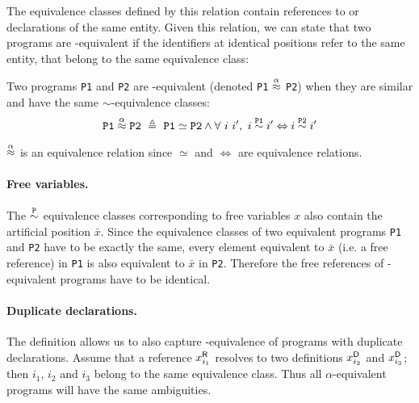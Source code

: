 \noindent
The equivalence classes defined by this relation contain references to or declarations of 
the same entity. 
Given this relation, we can state that two programs are \a-equivalent if the identifiers at identical positions refer to the same entity, that belong to the same equivalence class:

\begin{definition}[\a-equivalence] Two programs {\tt P1} and {\tt P2} are \a-equivalent (denoted {\tt P1} $\stackrel{\alpha}{\approx}$ {\tt P2}) when they are similar and have the same $\sim$-equivalence classes:
\vspace*{-.5\baselineskip}
 $$\mtt{P1} \aeq \mtt{P2}\ \triangleq\ \mtt{P1} \simeq \mtt{P2} \wedge \forall\ i\ i',\ i \seq{\mtt{P1}} i' \Leftrightarrow i \seq{\mtt{P2}} i'$$
\end{definition}
\begin{remark}
\vspace*{-.5\baselineskip}
  $\stackrel{\alpha}{\approx}$ is an equivalence relation since $\simeq$ and $\Leftrightarrow$ are equivalence relations.
\end{remark}


\paragraph{Free variables.} The $\stackrel{\text{\tt P}}{\sim}$ equivalence classes
corresponding to free variables $x$ also contain the artificial position
$\bar{x}$. Since the equivalence classes of two equivalent programs {\tt P1} and
{\tt P2} have to be exactly the same, every element equivalent to $\bar{x}$
(i.e. a free reference) in {\tt P1} is also equivalent to $\bar{x}$ in {\tt P2}.
Therefore the free references of \a-equivalent programs have to be identical.

\paragraph{Duplicate declarations.}
The definition allows us to also capture \a-equivalence of programs with duplicate declarations. 
Assume that a reference ${x}^{\mbox{\scriptsize\sf R}}_{i_1}$ resolves to two definitions ${x}^{\mbox{\scriptsize\sf D}}_{i_2}$ and ${x}^{\mbox{\scriptsize\sf D}}_{i_3}$; then 
$i_1$, $i_2$ and $i_3$ belong to the same equivalence class. Thus all $\alpha$-equivalent programs will have the same ambiguities.

